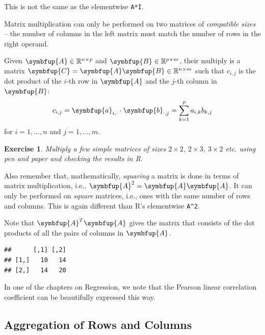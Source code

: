 \documentclass[10pt,b5paper,krantz1]{krantz}
\newenvironment{Shaded}{\begin{snugshade}}{\end{snugshade}}
\newcommand{\CommentTok}[1]{\textcolor[rgb]{0.37,0.37,0.37}{\textit{#1}}}
\newcommand{\KeywordTok}[1]{\textcolor[rgb]{0.27,0.27,0.27}{\textbf{#1}}}
\newcommand{\NormalTok}[1]{#1}
\newtheorem{exercise}{Exercise}[chapter]
\renewcommand{\mathbf}[1]{\symbfup{#1}}
\begin{document}
This is not the same as the elementwise \texttt{A*I}.

Matrix multiplication can only be performed on two matrices of
\emph{compatible sizes} -- the number of columns in the left matrix must match
the number of rows in the right operand.

Given \(\mathbf{A}\in\mathbb{R}^{n\times p}\)
and \(\mathbf{B}\in\mathbb{R}^{p\times m}\), their multiply is a matrix
\(\mathbf{C}=\mathbf{A}\mathbf{B}\in\mathbb{R}^{n\times m}\)
such that \(c_{i,j}\) is the dot product of the \(i\)-th row in \(\mathbf{A}\)
and the \(j\)-th column in \(\mathbf{B}\):
\[
c_{i,j} = \mathbf{a}_{i,\cdot} \cdot \mathbf{b}_{\cdot,j}
= \sum_{k=1}^p a_{i,k} b_{k, j}
\]
for \(i=1,\dots,n\) and \(j=1,\dots,m\).

\begin{exercise}

Multiply
a few simple matrices of sizes \(2\times 2\), \(2\times 3\), \(3\times 2\) etc.
using pen and paper and checking the results in R.

\end{exercise}

Also remember that, mathematically,
\emph{squaring} a matrix is done in terms of matrix multiplication,
i.e., \(\mathbf{A}^2 = \mathbf{A}\mathbf{A}\).
It can only be performed on \emph{square} matrices, i.e., ones with the same number
of rows and columns.
This is again different than R's elementwise \texttt{A\^{}2}.

Note that \(\mathbf{A}^T \mathbf{A}\)
gives the matrix that consists of the dot products of all the pairs
of columns in \(\mathbf{A}\).

\begin{Shaded}
\end{Shaded}

\begin{verbatim}
##      [,1] [,2]
## [1,]   10   14
## [2,]   14   20
\end{verbatim}

In one of the chapters on Regression, we note
that the Pearson linear correlation coefficient
can be beautifully expressed this way.

\hypertarget{aggregation-of-rows-and-columns}{%
\subsection{Aggregation of Rows and Columns}\label{aggregation-of-rows-and-columns}}
\end{document}
